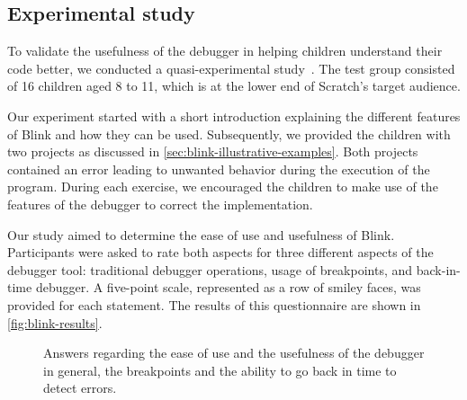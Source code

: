 \documentclass[../main]{subfiles}
\begin{document}
\subsection{Experimental study}\label{subsec:blink-experimental-study}
To validate the usefulness of the debugger in helping children understand their code better, we conducted a quasi-experimental study~\autocite{shadishExperimentalQuasiexperimentalDesigns2002a}.
The test group consisted of 16 children aged 8 to 11, which is at the lower end of Scratch's target audience.

Our experiment started with a short introduction explaining the different features of Blink and how they can be used.
Subsequently, we provided the children with two projects as discussed in \vref{sec:blink-illustrative-examples}.
Both projects contained an error leading to unwanted behavior during the execution of the program.
During each exercise, we encouraged the children to make use of the features of the debugger to correct the implementation.

Our study aimed to determine the ease of use and usefulness of Blink.
Participants were asked to rate both aspects for three different aspects of the debugger tool: traditional debugger operations, usage of breakpoints, and back-in-time debugger.
A five-point scale, represented as a row of smiley faces, was provided for each statement.
The results of this questionnaire are shown in \vref{fig:blink-results}.

\begin{figure}
    \centering
    
    \caption{
        Answers regarding the ease of use and the usefulness of the debugger in general,
        the breakpoints and the ability to go back in time to detect errors.
    }
    \label{fig:blink-results}
\end{figure}
\end{document}
